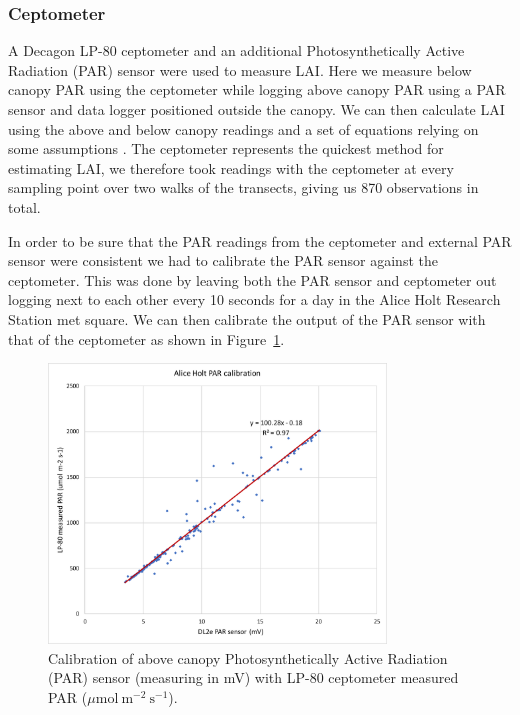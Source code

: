 \subsubsection{Ceptometer}

A Decagon LP-80 ceptometer and an additional Photosynthetically Active Radiation (PAR) sensor were used to measure LAI. Here we measure below canopy PAR using the ceptometer while logging above canopy PAR using a PAR sensor and data logger positioned outside the canopy. We can then calculate LAI using the above and below canopy readings and a set of equations relying on some assumptions \citep{fassnacht1994comparison}. The ceptometer represents the quickest method for estimating LAI, we therefore took readings with the ceptometer at every sampling point over two walks of the transects, giving us 870 observations in total.

In order to be sure that the PAR readings from the ceptometer and external PAR sensor were consistent we had to calibrate the PAR sensor against the ceptometer. This was done by leaving both the PAR sensor and ceptometer out logging next to each other every 10 seconds for a day in the Alice Holt Research Station met square. We can then calibrate the output of the PAR sensor with that of the ceptometer as shown in Figure~\ref{chap4:fig:par_calib}. 

\begin{figure}[ht]
    \centering
    \includegraphics[width=0.8\textwidth]{chapter/chapter4/AH_PAR.pdf}
    \caption{Calibration of above canopy Photosynthetically Active Radiation (PAR) sensor (measuring in mV) with LP-80 ceptometer measured PAR (\(\mu \text{mol}~\text{m}^{-2}~\text{s}^{-1} \)).} \label{chap4:fig:par_calib}
\end{figure}

